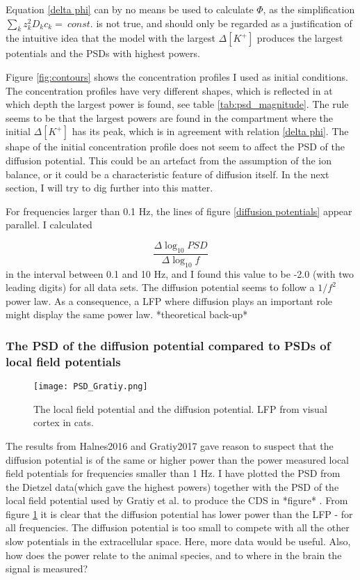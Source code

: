 \documentclass{article}
\begin{document}
Equation \ref{delta phi} can by no means be used to calculate $\Phi$, as the simplification $\sum_k z_k^2 D_k c_k =\ const.$ is not true, and should only be regarded as a justification of the intuitive idea that the model with the largest $\Delta [K^+]$ produces the largest potentials and the PSDs with highest powers. 


Figure \ref{fig:contours} shows the concentration profiles I used as initial conditions. The concentration profiles have very different shapes, which is reflected in at which depth the largest power is found, see table \ref{tab:psd_magnitude}. The rule seems to be that the largest powers are found in the compartment where the initial $\Delta [K^+]$ has its peak, which is in agreement with relation \ref{delta phi}. The shape of the initial concentration profile does not seem to affect the PSD of the diffusion potential. This could be an artefact from the assumption of the ion balance, or it could be a characteristic feature of diffusion itself. In the next section, I will try to dig further into this matter. 


For frequencies larger than 0.1 Hz, the lines of figure \ref{diffusion potentials} appear  parallel. I calculated 

$$\frac{\Delta\log_{10}PSD}{\Delta \log_{10}f}$$
in the interval between 0.1 and 10 Hz, and I found this value to be -2.0 (with two leading digits) for all data sets. The diffusion potential seems to follow a $1/f^2$ power law. As a consequence, a LFP where diffusion plays an important role might display the same power law.  *theoretical back-up*







\subsubsection{The PSD of the diffusion potential compared to PSDs of local field potentials}

\begin{figure}
  \texttt{[image: PSD\_Gratiy.png]}
  \caption{The local field potential and the diffusion potential. LFP from visual cortex in cats.}
  \label{fig:PSD_Gratiy}
\end{figure}

The results from Halnes2016 and Gratiy2017 gave reason to suspect that the diffusion potential is of the same or higher power than the power measured local field potentials for frequencies smaller than 1 Hz. I have plotted the PSD from the Dietzel data(which gave the highest powers) together with the PSD of the local field potential used by Gratiy et al. to produce the CDS in *figure* . From figure \ref{fig:PSD_Gratiy} it is clear that the diffusion potential has lower power than the LFP  - for all frequencies. The diffusion potential is too small to compete with all the other slow potentials in the extracellular space. Here, more data would be useful. Also, how does the power relate to the animal species, and to where in the brain the signal is measured?
\end{document}
